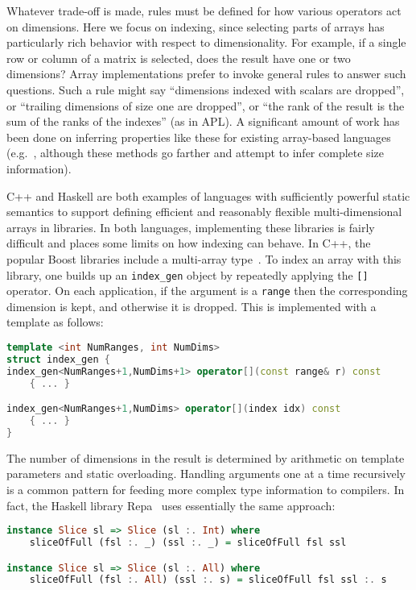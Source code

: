 Whatever trade-off is made, rules must be defined for how various operators
act on dimensions.
Here we focus on indexing, since selecting parts of arrays has particularly
rich behavior with respect to dimensionality.
For example, if a single row or column of a matrix is
selected, does the result have one or two dimensions?
Array implementations prefer to invoke general rules to answer such questions.
Such a rule might say ``dimensions indexed with scalars are dropped'', or ``trailing
dimensions of size one are dropped'', or ``the rank of the result
is the sum of the ranks of the indexes'' (as in APL).
A significant amount of work has been done on inferring properties like these
for existing array-based languages
(e.g.\ \cite{Joisha:2006:AAS:1152649.1152651,Garg:2014:JSI:2627373.2627382},
although these methods go farther and attempt to infer complete size
information).

C++ and Haskell are both examples of languages with sufficiently powerful
static semantics to support defining efficient and reasonably flexible
multi-dimensional arrays in libraries.
In both languages, implementing these libraries is fairly difficult and
places some limits on how indexing can behave.
In C++, the popular Boost libraries include a multi-array
type~\cite{garcia2005multiarray}.
To index an array with this library, one builds up an \texttt{index\_gen}
object by repeatedly applying the \texttt{[]} operator.
On each application, if the argument is a \texttt{range} then the
corresponding dimension is kept, and otherwise it is dropped.
This is implemented with a template as follows:

\begin{singlespace}
\begin{lstlisting}[language=c++,style=ttcode]
template <int NumRanges, int NumDims>
struct index_gen {
index_gen<NumRanges+1,NumDims+1> operator[](const range& r) const
    { ... }

index_gen<NumRanges+1,NumDims> operator[](index idx) const
    { ... }
}
\end{lstlisting}
\end{singlespace}

\noindent
The number of dimensions in the result is determined by arithmetic
on template parameters and static overloading.
Handling arguments one at a time recursively is a common pattern
for feeding more complex type information to compilers.
In fact, the Haskell library Repa~\cite{Keller:2010rs} uses
essentially the same approach:

\begin{singlespace}
\begin{lstlisting}[language=haskell,style=ttcode]
instance Slice sl => Slice (sl :. Int) where
    sliceOfFull (fsl :. _) (ssl :. _) = sliceOfFull fsl ssl

instance Slice sl => Slice (sl :. All) where
    sliceOfFull (fsl :. All) (ssl :. s) = sliceOfFull fsl ssl :. s
\end{lstlisting}
\end{singlespace}

